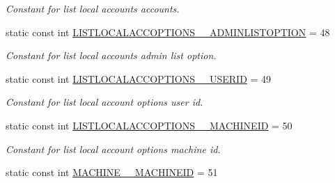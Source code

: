 \begin{DoxyCompactItemize}
\begin{DoxyCompactList}\small\item\em Constant for list local accounts accounts. \item\end{DoxyCompactList}\item 
\hypertarget{classUMS__Data_1_1UMS__DataPackage_a435a77183bfb44241627cc3868309380}{
static const int \hyperlink{classUMS__Data_1_1UMS__DataPackage_a435a77183bfb44241627cc3868309380}{LISTLOCALACCOPTIONS\_\-\_\-ADMINLISTOPTION} = 48}
\label{classUMS__Data_1_1UMS__DataPackage_a435a77183bfb44241627cc3868309380}

\begin{DoxyCompactList}\small\item\em Constant for list local accounts admin list option. \item\end{DoxyCompactList}\item 
\hypertarget{classUMS__Data_1_1UMS__DataPackage_a7b3a97e110c0796d0b4b5832654211f1}{
static const int \hyperlink{classUMS__Data_1_1UMS__DataPackage_a7b3a97e110c0796d0b4b5832654211f1}{LISTLOCALACCOPTIONS\_\-\_\-USERID} = 49}
\label{classUMS__Data_1_1UMS__DataPackage_a7b3a97e110c0796d0b4b5832654211f1}

\begin{DoxyCompactList}\small\item\em Constant for list local account options user id. \item\end{DoxyCompactList}\item 
\hypertarget{classUMS__Data_1_1UMS__DataPackage_a14c53393be5791f913ec6a7c7ff2dcdd}{
static const int \hyperlink{classUMS__Data_1_1UMS__DataPackage_a14c53393be5791f913ec6a7c7ff2dcdd}{LISTLOCALACCOPTIONS\_\-\_\-MACHINEID} = 50}
\label{classUMS__Data_1_1UMS__DataPackage_a14c53393be5791f913ec6a7c7ff2dcdd}

\begin{DoxyCompactList}\small\item\em Constant for list local account options machine id. \item\end{DoxyCompactList}\item 
\hypertarget{classUMS__Data_1_1UMS__DataPackage_a250bdefa3219fb57001d1557884f0e1f}{
static const int \hyperlink{classUMS__Data_1_1UMS__DataPackage_a250bdefa3219fb57001d1557884f0e1f}{MACHINE\_\-\_\-MACHINEID} = 51}
\label{classUMS__Data_1_1UMS__DataPackage_a250bdefa3219fb57001d1557884f0e1f}


\end{DoxyCompactItemize}
